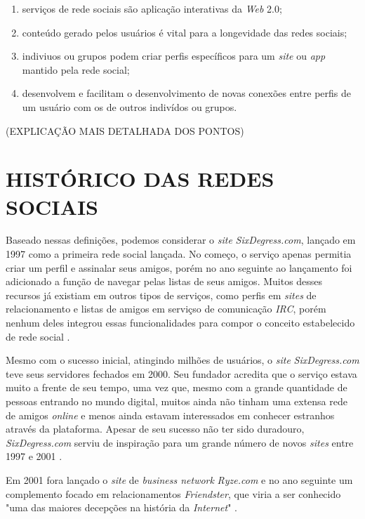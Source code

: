 \begin{enumerate}
	\item serviços de rede sociais são aplicação interativas da \textit{Web} 2.0;
	\item conteúdo gerado pelos usuários é vital para a longevidade das redes sociais;
	\item indiviuos ou grupos podem criar perfis específicos para um \textit{site} ou \textit{app} mantido pela rede social;
	\item desenvolvem e facilitam o desenvolvimento de novas conexões entre perfis de um usuário com os de outros indivídos ou grupos.
\end{enumerate}

(EXPLICAÇÃO MAIS DETALHADA DOS PONTOS)

\section{HISTÓRICO DAS REDES SOCIAIS}
\label{sec:historicoRedesSociais}

Baseado nessas definições, podemos considerar o \textit{site} \textit{SixDegress.com}, lançado em 1997 como a primeira rede social lançada. No começo, o serviço apenas permitia criar um perfil e assinalar seus amigos, porém no ano seguinte ao lançamento foi adicionado a função de navegar pelas listas de seus amigos. Muitos desses recursos já existiam em outros tipos de serviços, como perfis em \textit{sites} de relacionamento e listas de amigos em serviçso de comunicação \textit{IRC}, porém nenhum deles integrou essas funcionalidades para compor o conceito estabelecido de rede social .

Mesmo com o sucesso inicial, atingindo milhões de usuários, o \textit{site} \textit{SixDegress.com} teve seus servidores fechados em 2000. Seu fundador acredita que o serviço estava muito a frente de seu tempo, uma vez que, mesmo com a grande quantidade de pessoas entrando no mundo digital, muitos ainda não tinham uma extensa rede de amigos \textit{online} e menos ainda estavam interessados em conhecer estranhos através da plataforma. Apesar de seu sucesso não ter sido duradouro, \textit{SixDegress.com} serviu de inspiração para um grande número de novos \textit{sites} entre 1997 e 2001 .

Em 2001 fora lançado o \textit{site} de \textit{business network} \textit{Ryze.com} e no ano seguinte um complemento focado em relacionamentos \textit{Friendster}, que viria a ser conhecido "uma das maiores decepções na história da \textit{Internet}" .

